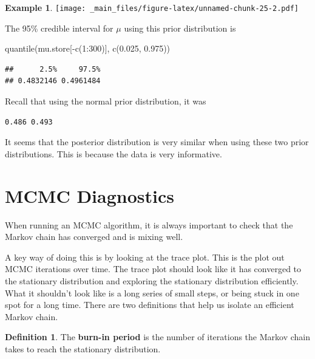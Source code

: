 \documentclass[
]{book}
\newenvironment{Shaded}{\begin{snugshade}}{\end{snugshade}}
\newcommand{\DecValTok}[1]{\textcolor[rgb]{0.00,0.00,0.81}{#1}}
\newcommand{\FloatTok}[1]{\textcolor[rgb]{0.00,0.00,0.81}{#1}}
\newcommand{\FunctionTok}[1]{\textcolor[rgb]{0.00,0.00,0.00}{#1}}
\newcommand{\NormalTok}[1]{#1}
\newcommand{\SpecialCharTok}[1]{\textcolor[rgb]{0.00,0.00,0.00}{#1}}
\theoremstyle{definition}
\newtheorem{definition}{Definition}[chapter]
\theoremstyle{definition}
\newtheorem{example}{Example}[chapter]
\theoremstyle{definition}
\theoremstyle{definition}
\theoremstyle{remark}
\begin{document}
\begin{example}
\texttt{[image: \_main\_files/figure-latex/unnamed-chunk-25-2.pdf]}

The 95\% credible interval for \(\mu\) using this prior distribution is

\begin{Shaded}
\begin{Highlighting}[]
\FunctionTok{quantile}\NormalTok{(mu.store[}\SpecialCharTok{{-}}\FunctionTok{c}\NormalTok{(}\DecValTok{1}\SpecialCharTok{:}\DecValTok{300}\NormalTok{)], }\FunctionTok{c}\NormalTok{(}\FloatTok{0.025}\NormalTok{, }\FloatTok{0.975}\NormalTok{))}
\end{Highlighting}
\end{Shaded}

\begin{verbatim}
##      2.5%     97.5% 
## 0.4832146 0.4961484
\end{verbatim}

Recall that using the normal prior distribution, it was

\begin{verbatim}
0.486 0.493
\end{verbatim}

It seems that the posterior distribution is very similar when using these two prior distributions. This is because the data is very informative.
\end{example}

\hypertarget{mcmc-diagnostics}{%
\section{MCMC Diagnostics}\label{mcmc-diagnostics}}

When running an MCMC algorithm, it is always important to check that the Markov chain has converged and is mixing well.

A key way of doing this is by looking at the trace plot. This is the plot out MCMC iterations over time. The trace plot should look like it has converged to the stationary distribution and exploring the stationary distribution efficiently. What it shouldn't look like is a long series of small steps, or being stuck in one spot for a long time. There are two definitions that help us isolate an efficient Markov chain.

\begin{definition}
The \textbf{burn-in period} is the number of iterations the Markov chain takes to reach the stationary distribution.
\end{definition}
\end{document}
